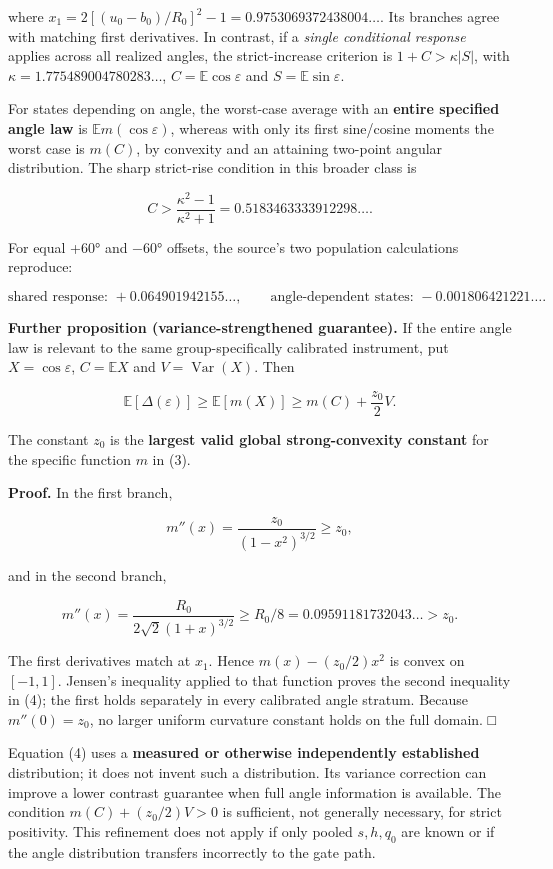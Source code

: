 \documentclass[
  10pt,
  a4paper,
]{article}
\begin{document}
where \(x_1=2[(u_0-b_0)/R_0]^2-1=0.9753069372438004\ldots\). Its branches agree with matching first derivatives. In contrast, if a \emph{single conditional response} applies across all realized angles, the strict-increase criterion is \(1+C>\kappa|S|\), with \(\kappa=1.775489004780283\ldots\), \(C=\mathbb E\cos\varepsilon\) and \(S=\mathbb E\sin\varepsilon\).

For states depending on angle, the worst-case average with an \textbf{entire specified angle law} is \(\mathbb E m(\cos\varepsilon)\), whereas with only its first sine/cosine moments the worst case is \(m(C)\), by convexity and an attaining two-point angular distribution. The sharp strict-rise condition in this broader class is

\[
 C>\frac{\kappa^2-1}{\kappa^2+1}=0.5183463333912298\ldots.
\]

For equal +60° and −60° offsets, the source's two population calculations reproduce:

\[
 \text{shared response: }+0.064901942155\ldots,\qquad
 \text{angle-dependent states: }-0.001806421221\ldots.
\]

\textbf{Further proposition (variance-strengthened guarantee).} If the entire angle law is relevant to the same group-specifically calibrated instrument, put \(X=\cos\varepsilon\), \(C=\mathbb E X\) and \(V=\operatorname{Var}(X)\). Then

\[
 \boxed{\mathbb E[\Delta(\varepsilon)]
 \ge\mathbb E[m(X)]\ge m(C)+\frac{z_0}{2}V.}\tag{4}
\]

The constant \(z_0\) is the \textbf{largest valid global strong-convexity constant} for the specific function \(m\) in (3).

\textbf{Proof.} In the first branch,

\[
 m''(x)=\frac{z_0}{(1-x^2)^{3/2}}\ge z_0,
\]

and in the second branch,

\[
 m''(x)=\frac{R_0}{2\sqrt2(1+x)^{3/2}}\ge R_0/8
 =0.09591181732043\ldots>z_0.
\]

The first derivatives match at \(x_1\). Hence \(m(x)-(z_0/2)x^2\) is convex on \([-1,1]\). Jensen's inequality applied to that function proves the second inequality in (4); the first holds separately in every calibrated angle stratum. Because \(m''(0)=z_0\), no larger uniform curvature constant holds on the full domain. □

Equation (4) uses a \textbf{measured or otherwise independently established} distribution; it does not invent such a distribution. Its variance correction can improve a lower contrast guarantee when full angle information is available. The condition \(m(C)+(z_0/2)V>0\) is sufficient, not generally necessary, for strict positivity. This refinement does not apply if only pooled \(s,h,q_0\) are known or if the angle distribution transfers incorrectly to the gate path.
\end{document}
